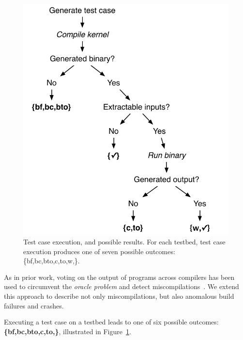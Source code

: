 \begin{figure}
  \centering %
  \includegraphics[width=.8\columnwidth]{img/test_process}%
  \caption{%
 	  Test case execution, and possible results. For each testbed, test case execution produces one of seven possible outcomes: \{bf,bc,bto,c,to,w,\cmark\}.%
  }%
  \label{fig:test-process} %
\end{figure}

As in prior work, voting on the output of programs across compilers has been used to circumvent the \emph{oracle problem} and detect miscompilations~\cite{McKeeman1998}.
We extend this approach to describe not only miscompilations, but also anomalous build failures and crashes.

Executing a test case on a testbed leads to one of six possible outcomes: \textbf{\{bf,bc,bto,c,to,\cmark\}}, illustrated in Figure~\ref{fig:test-process}.

